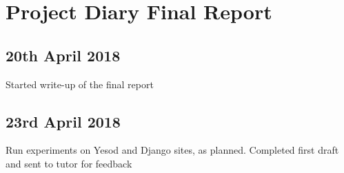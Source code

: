 \section{Project Diary Final Report}

\subsection{20th April 2018}
Started write-up of the final report

\subsection{23rd April 2018}
Run experiments on Yesod and Django sites, as planned.
Completed first draft and sent to tutor for feedback
